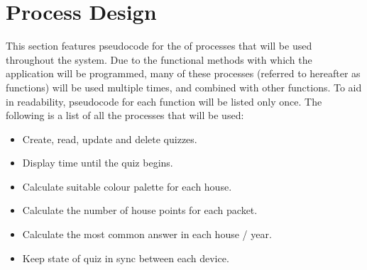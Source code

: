 \section{Process Design}
This section features pseudocode for the of processes that will be used throughout the system. Due to the functional methods with which the application will be programmed, many of these processes (referred to hereafter as functions) will be used multiple times, and combined with other functions. To aid in readability, pseudocode for each function will be listed only once. The following is a list of all the processes that will be used:

\begin{itemize}
\item Create, read, update and delete quizzes.
\item Display time until the quiz begins.
\item Calculate suitable colour palette for each house.
\item Calculate the number of house points for each packet.
\item Calculate the most common answer in each house / year.
\item Keep state of quiz in sync between each device.
\end{itemize}




